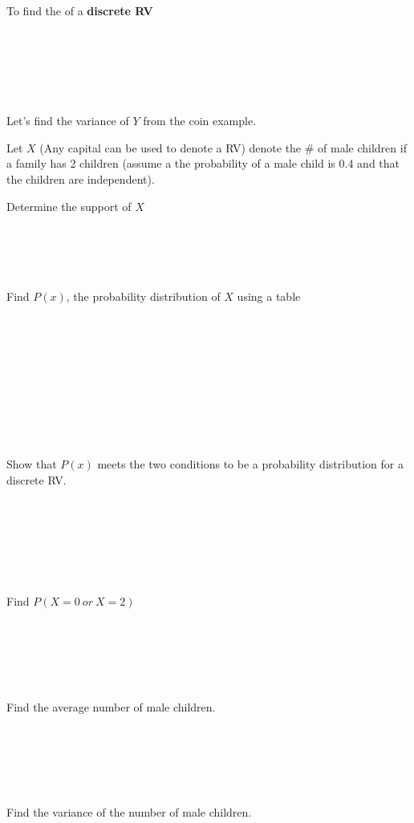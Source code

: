 To find the \underbar{~~~~~~~~~~~~~~~~~~~~~~~~~~~~~~~~~~~~~~~~~~~~~~~~} of a \textbf{discrete RV}\\~\\~\\~\\~\\~\\~\\

Let's find the variance of $Y$ from the coin example.

\newpage


Let $X$ (Any capital can be used to denote a RV) denote the \# of male children if a family has 2 children (assume a the probability of a male child is 0.4 and that the children are independent).
\bi
\item{Determine the support of $X$}\\~\\~\\~\\~\\
\item{Find $P(x)$, the probability distribution of $X$ using a table}\\~\\~\\~\\~\\~\\~\\~\\~\\~\\
\item{Show that $P(x)$ meets the two conditions to be a probability distribution for a discrete RV.}\\~\\~\\~\\~\\~\\~\\
\item{Find $P(X=0~or~X=2)$}\\~\\~\\~\\~\\~\\
\item Find the average number of male children.\\~\\~\\~\\~\\~\\
\item Find the variance of the number of male children.
\ei


